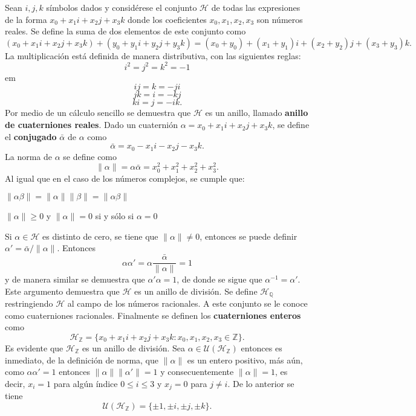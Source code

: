 \begin{ejemplo}
Sean $i,j,k$ símbolos dados y considérese el conjunto $\mathcal{H}$ de todas las expresiones de la forma $x_0 + x_1i+x_2j+x_3k$ donde los coeficientes $x_0,x_1,x_2,x_3$ son números reales.
Se define la suma de dos elementos de este conjunto como \[ (x_0 + x_1i+x_2j+x_3k)+(y_0 + y_1i+y_2j+y_3k) = (x_0 + y_0) + (x_1 + y_1)i + (x_2+y_2)j + (x_3+y_3)k.  \] La multiplicación está definida de manera distributiva, con las siguientes reglas:
\begin{equation*}
i^2 = j^2 = k^2 = -1
\end{equation*}
 em
\begin{equation*}
ij = k = -ji
\end{equation*} \[ jk = i = -kj \] \[ ki = j = -ik .\] Por medio de un cálculo sencillo se demuestra que $\mathcal{H}$ es un anillo, llamado \textbf{anillo de cuaterniones reales}. Dado un cuaternión $\alpha = x_0 + x_1i + x_2j + x_3k$, se define el \textbf{conjugado} $\bar{\alpha}$ de $\alpha$ como \[ \bar{\alpha} = x_0-x_1i - x_2j-x_3k. \] La norma de $\alpha$ se define como \[ \lVert \alpha \rVert = \alpha\bar{\alpha} = x_0 ^2 + x_1^2 + x_ 2^2 + x_ 3^2. \]
Al igual que en el caso de los números complejos, se cumple que:
\begin{bulletList}
\item $\lVert \alpha\beta \rVert = \lVert \alpha \rVert \lVert \beta \rVert = \lVert \alpha\beta \rVert$
\item $\lVert \alpha \rVert \geq 0$ y $\lVert \alpha \rVert  = 0 $ si y sólo si $\alpha = 0 $
\end{bulletList}
Si $\alpha \in \mathcal{H}$ es distinto de cero, se tiene que $\lVert \alpha \rVert \neq 0$, entonces se puede definir $\alpha' = \bar{\alpha}/\lVert \alpha \rVert$. Entonces \[ \alpha\alpha'= \alpha \frac{\bar{\alpha}}{\lVert \alpha \rVert} = 1 \] y de manera similar se demuestra que $\alpha'\alpha = 1$, de donde se sigue que $\alpha^{-1} = \alpha'$. Este argumento demuestra que $\mathcal{H}$ es un anillo de división.
Se define $\mathcal{H}_{\mathds{Q}}$ restringiendo $\mathcal{H}$ al campo de los números racionales. A este conjunto se le conoce como cuaterniones racionales.
Finalmente se definen los \textbf{cuaterniones enteros} como \[ \mathcal{H}_{\mathds{Z}} = \{ x_0 + x_1i + x_2j + x_3k \colon x_0, x_1, x_2, x_3 \in \mathds{Z} \}. \]
Es evidente que $\mathcal{H}_{\mathds{Z}}$ es un anillo de división.
Sea $\alpha \in \mathcal{U}(\mathcal{H}_{\mathds{Z}})$ entonces es inmediato, de la definición de norma, que $\lVert \alpha \rVert$ es un entero positivo, más aún, como $\alpha\alpha'= 1$ entonces $\lVert \alpha \rVert \lVert \alpha'\rVert = 1$ y consecuentemente $\lVert \alpha \rVert = 1$, es decir, $x_i = 1$ para algún índice $0\leq i \leq 3 $ y $x_j = 0 $ para $j \neq i$. De lo anterior se tiene \[ \mathcal{U}(\mathcal{H}_{\mathds{Z}}) = \{ \pm1, \pm i, \pm j, \pm k \}. \] 
\end{ejemplo} 
